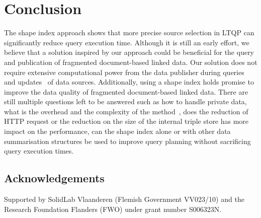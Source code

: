 \section{Conclusion}



The shape index approach shows that more precise source selection in LTQP can significantly reduce query execution time.
Although it is still an early effort, we believe that a solution inspired by our approach could be beneficial for the query and publication of fragmented document-based linked data.
Our solution does not require extensive computational power from the data publisher during queries and updates~ of data sources.
Additionally, using a shape index holds promise to improve the data quality of fragmented document-based linked data.
There are still multiple questions left to be answered such as how to handle private data, what is the overhead and the complexity of the method~,
does the reduction of HTTP request or the reduction on the size of the internal triple store has more impact on the performance,
can the shape index alone or with other data summarisation structures be used to improve query planning without sacrificing query execution times.

\subsection*{Acknowledgements}
Supported by SolidLab Vlaanderen (Flemish Government VV023/10) and the Research Foundation Flanders (FWO) under grant number S006323N.
